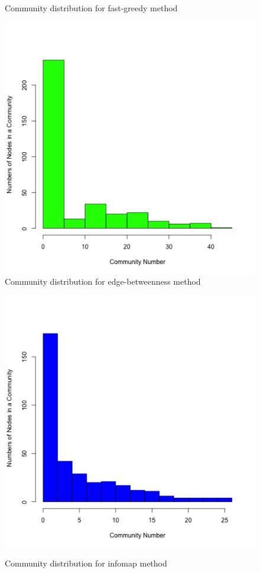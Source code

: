 \documentclass{article}
\begin{document}
\begin{figure}[htbp]
{\begin{minipage}[b]{0.4\textwidth}
\caption*{Community distribution for fast-greedy method}
\includegraphics[width=1\textwidth]{3_5.png}\\
\caption*{Community distribution for edge-betweenness method}
\includegraphics[width=1\textwidth]{3_7.png}
\caption*{Community distribution for infomap method}
\end{minipage}
}
\caption{}

\label{fig:p3_2}
\end{figure}
\end{document}
